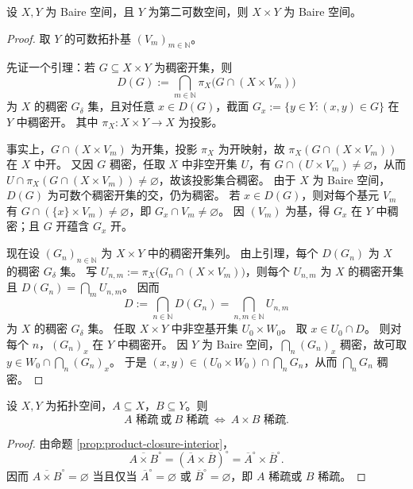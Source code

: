 \documentclass[lang=cn,a4paper,newtx,figureplace=section,tableplace=section]{elegantbook}
\begin{document}
\begin{proposition}\label{prop:baire-product-second-countable}
  设 $X,Y$ 为 Baire 空间，且 $Y$ 为第二可数空间，则 $X\times Y$ 为 Baire 空间。
\end{proposition}
\begin{proof}
  取 $Y$ 的可数拓扑基 $(V_m)_{m\in\mathbb N}$。

  先证一个引理：若 $G\subseteq X\times Y$ 为稠密开集，则
  \[
    D(G):=\bigcap_{m\in\mathbb N}\pi_X\big(G\cap(X\times V_m)\big)
  \]
  为 $X$ 的稠密 $G_\delta$ 集，且对任意 $x\in D(G)$，截面 $G_x:=\{y\in Y:(x,y)\in G\}$ 在 $Y$ 中稠密开。
  其中 $\pi_X:X\times Y\to X$ 为投影。
  
  事实上，$G\cap(X\times V_m)$ 为开集，投影 $\pi_X$ 为开映射，故 $\pi_X(G\cap(X\times V_m))$ 在 $X$ 中开。
  又因 $G$ 稠密，任取 $X$ 中非空开集 $U$，有 $G\cap(U\times V_m)\neq\varnothing$，从而 $U\cap\pi_X(G\cap(X\times V_m))\neq\varnothing$，故该投影集合稠密。
  由于 $X$ 为 Baire 空间，$D(G)$ 为可数个稠密开集的交，仍为稠密。
  若 $x\in D(G)$，则对每个基元 $V_m$ 有 $G\cap(\{x\}\times V_m)\neq\varnothing$，即 $G_x\cap V_m\neq\varnothing$。
  因 $(V_m)$ 为基，得 $G_x$ 在 $Y$ 中稠密；且 $G$ 开蕴含 $G_x$ 开。

  现在设 $(G_n)_{n\in\mathbb N}$ 为 $X\times Y$ 中的稠密开集列。
  由上引理，每个 $D(G_n)$ 为 $X$ 的稠密 $G_\delta$ 集。
  写 $U_{n,m}:=\pi_X\big(G_n\cap(X\times V_m)\big)$，则每个 $U_{n,m}$ 为 $X$ 的稠密开集且 $D(G_n)=\bigcap_m U_{n,m}$。
  因而
  \[
    D:=\bigcap_{n\in\mathbb N}D(G_n)=\bigcap_{n,m\in\mathbb N}U_{n,m}
  \]
  为 $X$ 的稠密 $G_\delta$ 集。
  任取 $X\times Y$ 中非空基开集 $U_0\times W_0$。
  取 $x\in U_0\cap D$。
  则对每个 $n$，$(G_n)_x$ 在 $Y$ 中稠密开。
  因 $Y$ 为 Baire 空间，$\bigcap_n (G_n)_x$ 稠密，故可取 $y\in W_0\cap\bigcap_n (G_n)_x$。
  于是 $(x,y)\in (U_0\times W_0)\cap\bigcap_n G_n$，从而 $\bigcap_n G_n$ 稠密。
\end{proof}

\begin{proposition}\label{prop:product-nowhere-dense}
  设 $X,Y$ 为拓扑空间，$A\subseteq X$，$B\subseteq Y$。则
  \[
    A\text{ 稀疏}\ \text{或}\ B\text{ 稀疏}\ \Leftrightarrow\ A\times B\text{ 稀疏}.
  \]
\end{proposition}
\begin{proof}
  由命题 \ref{prop:product-closure-interior}，
  \[
    \overline{A\times B}^\circ=(\overline A\times\overline B)^\circ=\overline A^\circ\times\overline B^\circ.
  \]
  因而 $\overline{A\times B}^\circ=\varnothing$ 当且仅当 $\overline A^\circ=\varnothing$ 或 $\overline B^\circ=\varnothing$，即 $A$ 稀疏或 $B$ 稀疏。
\end{proof}
\end{document}
